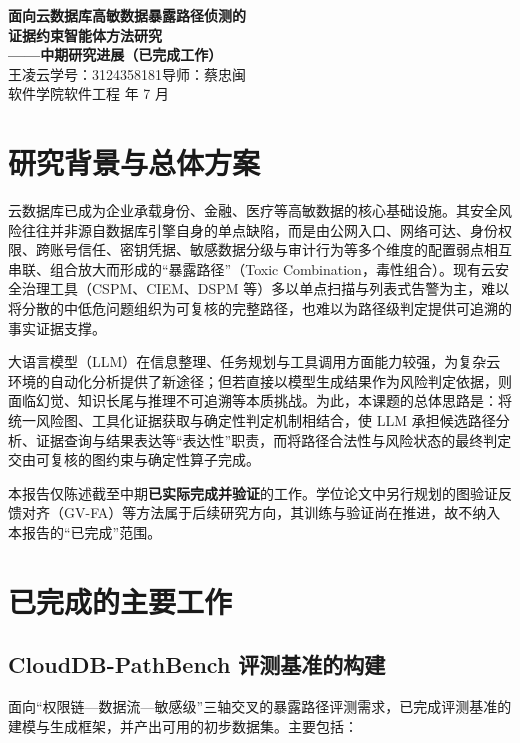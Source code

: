 \documentclass[a4paper,12pt]{ctexart}
\begin{document}
\begin{center}
{\bfseries 面向云数据库高敏数据暴露路径侦测的\\[0.3em]证据约束智能体方法研究}\\[1em]
{\bfseries ——中期研究进展（已完成工作）}\\[1.5em]
{ 王凌云\quad 学号：3124358181\quad 导师：蔡忠闽}\\[0.5em]
{ 软件学院\quad 软件工程 年 7 月}
\end{center}

\vspace{1em}

\section{研究背景与总体方案}

云数据库已成为企业承载身份、金融、医疗等高敏数据的核心基础设施。其安全风险往往并非源自数据库引擎自身的单点缺陷，而是由公网入口、网络可达、身份权限、跨账号信任、密钥凭据、敏感数据分级与审计行为等多个维度的配置弱点相互串联、组合放大而形成的“暴露路径”（Toxic Combination，毒性组合）。现有云安全治理工具（CSPM、CIEM、DSPM 等）多以单点扫描与列表式告警为主，难以将分散的中低危问题组织为可复核的完整路径，也难以为路径级判定提供可追溯的事实证据支撑。

大语言模型（LLM）在信息整理、任务规划与工具调用方面能力较强，为复杂云环境的自动化分析提供了新途径；但若直接以模型生成结果作为风险判定依据，则面临幻觉、知识长尾与推理不可追溯等本质挑战。为此，本课题的总体思路是：将统一风险图、工具化证据获取与确定性判定机制相结合，使 LLM 承担候选路径分析、证据查询与结果表达等“表达性”职责，而将路径合法性与风险状态的最终判定交由可复核的图约束与确定性算子完成。

本报告仅陈述截至中期\textbf{已实际完成并验证}的工作。学位论文中另行规划的图验证反馈对齐（GV-FA）等方法属于后续研究方向，其训练与验证尚在推进，故不纳入本报告的“已完成”范围。

\section{已完成的主要工作}

\subsection{CloudDB-PathBench 评测基准的构建}

面向“权限链—数据流—敏感级”三轴交叉的暴露路径评测需求，已完成评测基准的建模与生成框架，并产出可用的初步数据集。主要包括：
\end{document}
